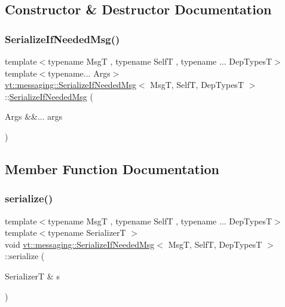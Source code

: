 \subsection{Constructor \& Destructor Documentation}
\mbox{\label{structvt_1_1messaging_1_1_serialize_if_needed_msg_aeca13b16b58fca6e1987d5d19d57b3b8}} 
\subsubsection{\texorpdfstring{Serialize\+If\+Needed\+Msg()}{SerializeIfNeededMsg()}}
{\footnotesize\ttfamily template$<$typename MsgT , typename SelfT , typename ... Dep\+TypesT$>$ \\
template$<$typename... Args$>$ \\
\hyperlink{structvt_1_1messaging_1_1_serialize_if_needed_msg}{vt\+::messaging\+::\+Serialize\+If\+Needed\+Msg}$<$ MsgT, SelfT, Dep\+TypesT $>$\+::\hyperlink{structvt_1_1messaging_1_1_serialize_if_needed_msg}{Serialize\+If\+Needed\+Msg} (\begin{DoxyParamCaption}\item[{Args \&\&...}]{args }\end{DoxyParamCaption})\hspace{0.3cm}{\ttfamily [inline]}}



\subsection{Member Function Documentation}
\mbox{\label{structvt_1_1messaging_1_1_serialize_if_needed_msg_acaf8965385e80bbbaabc8d335fe90eed}} 
\subsubsection{\texorpdfstring{serialize()}{serialize()}}
{\footnotesize\ttfamily template$<$typename MsgT , typename SelfT , typename ... Dep\+TypesT$>$ \\
template$<$typename SerializerT $>$ \\
void \hyperlink{structvt_1_1messaging_1_1_serialize_if_needed_msg}{vt\+::messaging\+::\+Serialize\+If\+Needed\+Msg}$<$ MsgT, SelfT, Dep\+TypesT $>$\+::serialize (\begin{DoxyParamCaption}\item[{SerializerT \&}]{s }\end{DoxyParamCaption})\hspace{0.3cm}{\ttfamily [inline]}}



